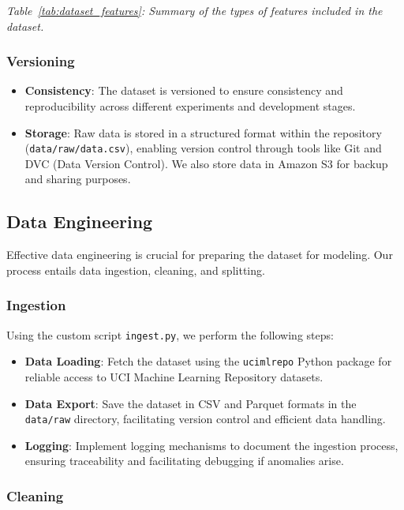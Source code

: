 \documentclass{article}
\begin{document}
\textit{Table~\ref{tab:dataset_features}: Summary of the types of features included in the dataset.}

\subsubsection{Versioning}

\begin{itemize}[leftmargin=*]
    \item \textbf{Consistency}: The dataset is versioned to ensure consistency and reproducibility across different experiments and development stages.
    \item \textbf{Storage}: Raw data is stored in a structured format within the repository (\texttt{data/raw/data.csv}), enabling version control through tools like Git and DVC (Data Version Control). We also store data in Amazon S3 for backup and sharing purposes.
\end{itemize}

\subsection{Data Engineering}

Effective data engineering is crucial for preparing the dataset for modeling. Our process entails data ingestion, cleaning, and splitting.

\subsubsection{Ingestion}

Using the custom script \texttt{ingest.py}, we perform the following steps:

\begin{itemize}[leftmargin=*]
    \item \textbf{Data Loading}: Fetch the dataset using the \texttt{ucimlrepo} Python package for reliable access to UCI Machine Learning Repository datasets.
    \item \textbf{Data Export}: Save the dataset in CSV and Parquet formats in the \texttt{data/raw} directory, facilitating version control and efficient data handling.
    \item \textbf{Logging}: Implement logging mechanisms to document the ingestion process, ensuring traceability and facilitating debugging if anomalies arise.
\end{itemize}

\subsubsection{Cleaning}
\end{document}
